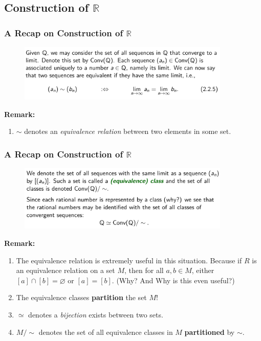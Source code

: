 \documentclass[10pt, t]{beamer}
\renewcommand{\emph}[1]{{\color{themecolor}\textsl{#1}}}
\newcommand{\R}{\mathbb{R}}
\renewcommand{\emptyset}{\varnothing}
\begin{document}
\subsection{Construction of $\R$}
\begin{frame}
    \frametitle{A Recap on Construction of $\R$}
    \begin{figure}[H]
        \centering
        \includegraphics[width=0.9\textwidth]{2020-10-13-20-08-40.png}
    \end{figure}
    \textbf{Remark:}
    \begin{enumerate}
        \item $\sim $ denotes an \emph{equivalence relation} between two elements in some set.
    \end{enumerate}
\end{frame}

\begin{frame}
    \frametitle{A Recap on Construction of $\R$}
    \begin{figure}[H]
        \centering
        \includegraphics[width=0.9\textwidth]{2020-10-13-21-11-42.png}
    \end{figure}
    \textbf{Remark:}
    \begin{enumerate}
        \item The equivalence relation is extremely useful in this situation. Because if $R$ is an equivalence relation on a set $M$, then for all $a,b\in M$, either $[a]\cap [b]=\emptyset$ or $[a]=[b]$. (Why? And Why is this even useful?)
        \item The equivalence classes \textbf{partition} the set $M$!
        \item $\simeq $ denotes a \emph{bijection} exists between two sets.
        \item $M/\sim$ denotes the set of all equivalence classes in $M$ \textbf{partitioned} by $\sim$.
    \end{enumerate}
\end{frame}
\end{document}
